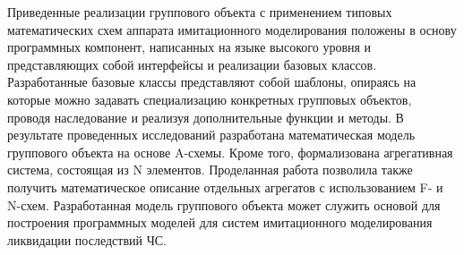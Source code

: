 \documentclass[12pt]{article}
\begin{document}
Приведенные реализации группового объекта с применением типовых математических схем аппарата имитационного моделирования положены в основу программных компонент, написанных на языке высокого
уровня и представляющих собой интерфейсы и реализации базовых классов. Разработанные базовые классы
представляют собой шаблоны, опираясь на которые
можно задавать специализацию конкретных групповых
объектов, проводя наследование и реализуя дополнительные функции и методы.
В результате проведенных исследований разработана математическая модель группового объекта на основе A-схемы. Кроме того, формализована агрегативная
система, состоящая из N элементов. Проделанная работа позволила также получить математическое описание
отдельных агрегатов с использованием F- и N-схем.
Разработанная модель группового объекта может
служить основой для построения программных моделей для систем имитационного моделирования ликвидации последствий ЧС.
\end{document}

